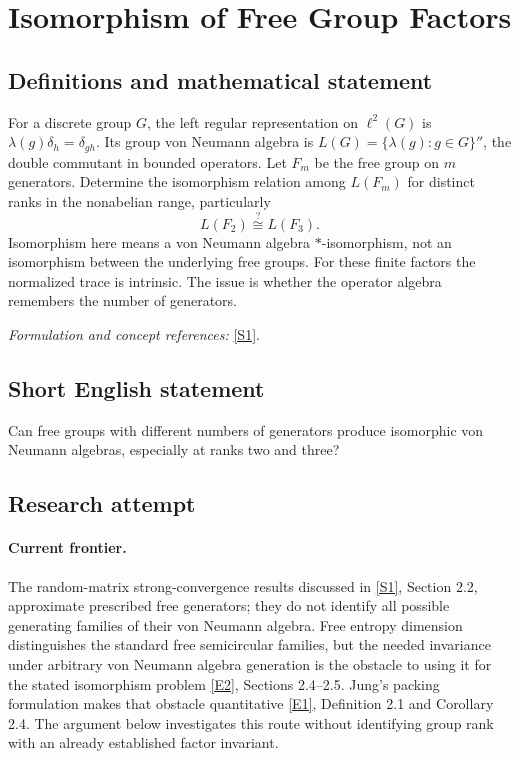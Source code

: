 \documentclass[11pt,a4paper]{article}
\newcommand{\sref}[2]{\hyperlink{source:#1:#2}{[S#2]}}
\newcommand{\eref}[2]{\hyperlink{extra:#1:#2}{[E#2]}}
\newif\ifshowcatalogue
\newcommand{\cataloguescope}[1]{\ifshowcatalogue
 \paragraph{Exact scope in the supplied catalogue.}
 \begin{quote}\small #1\end{quote}\fi}
\numberwithin{equation}{section}
\begin{document}
\setcounter{section}{0}
\clearpage
\section*{\texorpdfstring{Isomorphism of Free Group Factors}{Isomorphism of Free Group Factors}}\label{30001752}
\subsection{Definitions and mathematical statement}
For a discrete group $G$, the left regular representation on $\ell^2(G)$ is $\lambda(g)\delta_h=\delta_{gh}$. Its group von Neumann algebra is
$L(G)=\{\lambda(g):g\in G\}''$, the double commutant in bounded operators. Let $F_m$ be the free group on $m$ generators. Determine the isomorphism relation among $L(F_m)$ for distinct ranks in the nonabelian range, particularly
\[
 L(F_2)\stackrel{?}{\cong}L(F_3).
\]
Isomorphism here means a von Neumann algebra $*$-isomorphism, not an isomorphism between the underlying free groups. For these finite factors the normalized trace is intrinsic. The issue is whether the operator algebra remembers the number of generators.
\par\smallskip\textit{Formulation and concept references:} \sref{30001752}{1}.
\cataloguescope{Determine whether L(F\_m) and L(F\_n) are isomorphic when m != n, especially whether L(F\_2) is isomorphic to L(F\_3).}
\subsection{Short English statement}
Can free groups with different numbers of generators produce isomorphic von Neumann algebras, especially at ranks two and three?
\subsection{Research attempt}

\paragraph{Current frontier.}
The random-matrix strong-convergence results discussed in \sref{30001752}{1},
Section 2.2, approximate prescribed free generators; they do not identify
all possible generating families of their von Neumann algebra. Free entropy
dimension distinguishes the standard free semicircular families, but the
needed invariance under arbitrary von Neumann algebra generation is the
obstacle to using it for the stated isomorphism problem
\eref{30001752}{2}, Sections 2.4--2.5. Jung's packing formulation makes that
obstacle quantitative \eref{30001752}{1}, Definition 2.1 and Corollary 2.4.
The argument below investigates this route without identifying group rank
with an already established factor invariant.
\end{document}
